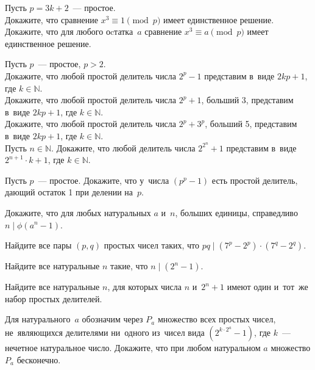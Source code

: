 \begin{problems}

\item
Пусть $p = 3 k + 2$~--- простое.
\\
\sp
Докажите, что сравнение $x^3 \equiv 1 \pmod{p}$ имеет единственное решение.
\\
\sp
Докажите, что для любого оcтатка~$a$ сравнение $x^3 \equiv a \pmod{p}$ имеет
единственное решение.

\item
Пусть $p$~--- простое, $p > 2$.
\\
\sp
Докажите, что любой простой делитель числа $2^p - 1$ представим
в~виде $2 k p + 1$, где $k \in \mathbb{N}$.
\\
\sp
Докажите, что любой простой делитель числа $2^p + 1$, больший 3, представим
в~виде $2 k p + 1$, где $k \in \mathbb{N}$.
\\
\sp
Докажите, что любой простой делитель числа $2^p + 3^p$, больший 5, представим
в~виде $2 k p + 1$, где $k \in \mathbb{N}$.
\\
\sp
Пусть $n \in \mathbb{N}$.
Докажите, что любой делитель числа $2^{2^n} + 1$ представим
в~виде $2^{n+1} \cdot k + 1$, где $k \in \mathbb{N}$.

\item
Пусть $p$~--- простое.
Докажите, что у~числа $(p^p - 1)$ есть простой делитель, дающий остаток 1 при
делении на~$p$.

\item
Докажите, что для любых натуральных $a$ и~$n$, больших единицы, справедливо
$n \mid \phi(a^n - 1)$.

\item
Найдите все пары $(p, q)$ простых чисел таких, что
$p q \mid (7^{p} - 2^{p}) \cdot (7^{q} - 2^{q})$.

\item
Найдите все натуральные $n$ такие, что $n \mid (2^n - 1)$.

\item
Найдите все натуральные $n$, для которых числа $n$ и~$2^n + 1$ имеют один
и~тот~же набор простых делителей. 	

\item
Для натурального~$a$ обозначим через $P_a$ множество всех простых чисел,
не~являющихся делителями ни~одного из~чисел вида $(2^{k \cdot 2^a} - 1)$, где
$k$~--- нечетное натуральное число.
Докажите, что при любом натуральном $a$ множество $P_a$ бесконечно.

\end{problems}

